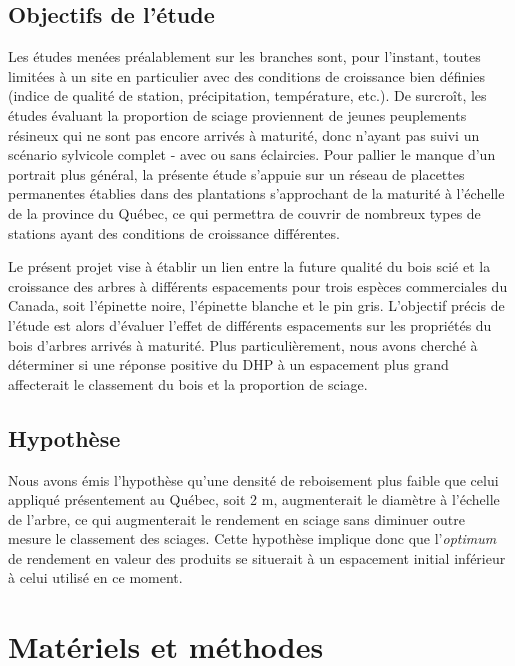 \documentclass[letterpaper, 12pt]{article}
\begin{document}
\begin{onehalfspace}
\subsection{Objectifs de l'étude}

Les études menées préalablement sur les branches sont, pour l'instant, toutes limitées à un site en particulier avec des conditions de croissance bien définies (indice de qualité de station, précipitation, température, etc.). De surcroît, les études évaluant la proportion de sciage proviennent de jeunes peuplements résineux qui ne sont pas encore arrivés à maturité, donc n’ayant pas suivi un scénario sylvicole complet - ­avec ou sans éclaircies. Pour pallier le manque d'un portrait plus général, la présente étude s’appuie sur un réseau de placettes permanentes établies dans des plantations s'approchant de la maturité à l’échelle de la province du Québec, ce qui permettra de couvrir de nombreux types de stations ayant des conditions de croissance différentes. 

\vspace{12pt}

Le présent projet vise à établir un lien entre la future qualité du bois scié et la croissance des arbres à différents espacements pour trois espèces commerciales du Canada, soit l'épinette noire, l'épinette blanche et le pin gris. L'objectif précis de l'étude est alors d'évaluer l'effet de différents espacements sur les propriétés du bois d'arbres arrivés à maturité. Plus particulièrement, nous avons cherché à déterminer si une réponse positive du DHP à un espacement plus grand affecterait le classement du bois et la proportion de sciage.

\subsection{Hypothèse}

Nous avons émis l'hypothèse qu'une densité de reboisement plus faible que celui appliqué présentement au Québec, soit 2 m, augmenterait le diamètre à l'échelle de l'arbre, ce qui augmenterait le rendement en sciage sans diminuer outre mesure le classement des sciages. Cette hypothèse implique donc que l'\textit{optimum} de rendement en valeur des produits se situerait à un espacement initial inférieur à celui utilisé en ce moment. 

\section{Matériels et méthodes}


\end{onehalfspace}
\end{document}
